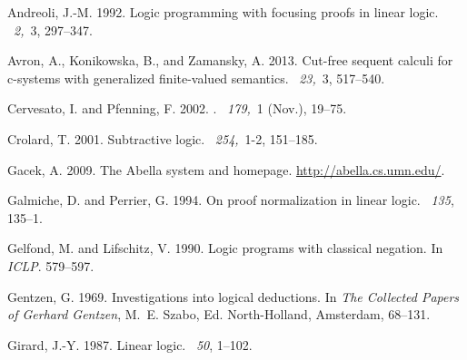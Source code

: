 \documentclass{new_tlp}
\begin{document}
\begin{thebibliography}{}

{\sc Andreoli, J.-M.} 1992.
\newblock Logic programming with focusing proofs in linear logic.
~{\em 2,\/}~3, 297--347.

{\sc Avron, A.}, {\sc Konikowska, B.}, {\sc and} {\sc Zamansky, A.} 2013.
\newblock Cut-free sequent calculi for c-systems with generalized finite-valued
  semantics.
~{\em 23,\/}~3, 517--540.

{\sc Cervesato, I.} {\sc and} {\sc Pfenning, F.} 2002.
.
~{\em 179,\/}~1 (Nov.), 19--75.

{\sc Crolard, T.} 2001.
\newblock Subtractive logic.
~{\em 254,\/}~1-2, 151--185.

{\sc Gacek, A.} 2009.
\newblock The {A}bella system and homepage.
\newblock \url{http://abella.cs.umn.edu/}.

{\sc Galmiche, D.} {\sc and} {\sc Perrier, G.} 1994.
\newblock On proof normalization in linear logic.
~{\em 135}, 135--1.

{\sc Gelfond, M.} {\sc and} {\sc Lifschitz, V.} 1990.
\newblock Logic programs with classical negation.
\newblock In {\em ICLP}. 579--597.

{\sc Gentzen, G.} 1969.
\newblock Investigations into logical deductions.
\newblock In {\em {The Collected Papers of Gerhard Gentzen}}, {M.~E. Szabo},
  Ed. North-Holland, Amsterdam, 68--131.

{\sc Girard, J.-Y.} 1987.
\newblock Linear logic.
~{\em 50}, 1--102.


\end{thebibliography}
\end{document}
